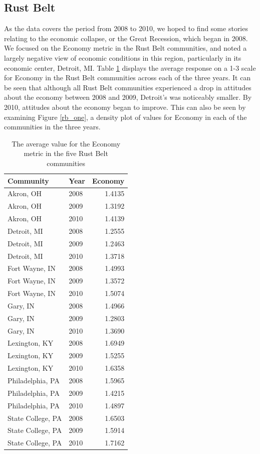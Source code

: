 \documentclass[11pt]{article}\usepackage{knitr}
\begin{document}
\subsection*{Rust Belt}
As the data covers the period from 2008 to 2010, we hoped to find some stories relating to the economic collapse, or the Great Recession, which began in 2008. We focused on the Economy metric in the Rust Belt communities, and noted a largely negative view of economic conditions in this region, particularly in its economic center, Detroit, MI. Table \ref{tbl:econ} displays the average response on a 1-3 scale for Economy in the Rust Belt communities across each of the three years. It can be seen that although all Rust Belt communities experienced a drop in attitudes about the economy between 2008 and 2009, Detroit's was noticeably smaller. By 2010, attitudes about the economy began to improve. This can also be seen by examining Figure \ref{rb_one}, a density plot of values for Economy in each of the communities in the three years.

\begin{table}[ht]
\centering
\begin{tabular}{llr}
  \hline
Community & Year & Economy \\ 
  \hline
Akron, OH & 2008 & 1.4135 \\ 
  Akron, OH & 2009 & 1.3192 \\ 
  Akron, OH & 2010 & 1.4139 \\ 
  Detroit, MI & 2008 & 1.2555 \\ 
  Detroit, MI & 2009 & 1.2463 \\ 
  Detroit, MI & 2010 & 1.3718 \\ 
  Fort Wayne, IN & 2008 & 1.4993 \\ 
  Fort Wayne, IN & 2009 & 1.3572 \\ 
  Fort Wayne, IN & 2010 & 1.5074 \\ 
  Gary, IN & 2008 & 1.4966 \\ 
  Gary, IN & 2009 & 1.2803 \\ 
  Gary, IN & 2010 & 1.3690 \\ 
  Lexington, KY & 2008 & 1.6949 \\ 
  Lexington, KY & 2009 & 1.5255 \\ 
  Lexington, KY & 2010 & 1.6358 \\ 
  Philadelphia, PA & 2008 & 1.5965 \\ 
  Philadelphia, PA & 2009 & 1.4215 \\ 
  Philadelphia, PA & 2010 & 1.4897 \\ 
  State College, PA & 2008 & 1.6503 \\ 
  State College, PA & 2009 & 1.5914 \\ 
  State College, PA & 2010 & 1.7162 \\ 
   \hline
\end{tabular}
\caption{The average value for the Economy metric in the five Rust Belt communities} 
\label{tbl:econ}
\end{table}
\end{document}
